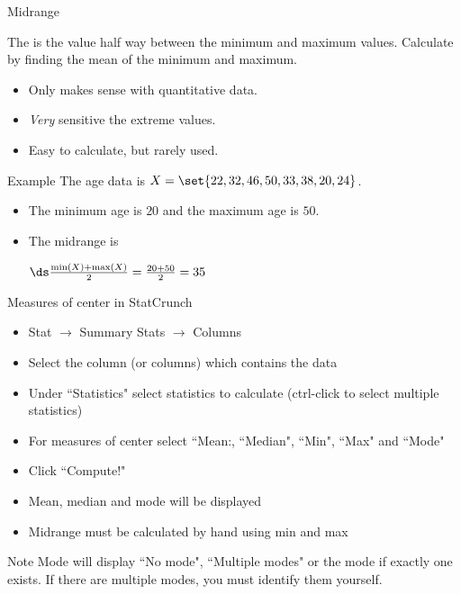 \documentclass[xcolor=table, handout]{beamer}
\begin{document}
\begin{frame}{Midrange}
\begin{block}{}
\large
The  is the value half way between the minimum and maximum values. Calculate by finding the mean of the minimum and maximum.
\begin{itemize}
\item Only makes sense with quantitative data.
\item \emph{Very} sensitive the extreme values.
\item Easy to calculate, but rarely used.
\end{itemize}
\end{block}

\pause
\begin{exampleblock}{Example}
The age data is $X = \set{22, 32, 46, 50, 33, 38, 20, 24}$.
\begin{itemize}
\item The minimum age is $20$ and the maximum age is $50$.
\item The midrange is \\
\smallskip
{\centering
$\ds \frac {\min(X) + \max(X)}{2} = \frac {20 + 50}{2} = 35$
\par}
\end{itemize}
\smallskip
\end{exampleblock}

\end{frame}

\begin{frame}{Measures of center in StatCrunch}
\begin{block}{}
\begin{itemize}
\item Stat $\to$ Summary Stats $\to$ Columns
\item Select the column (or columns) which contains the data
\item Under ``Statistics" select statistics to calculate (ctrl-click to select multiple statistics)
\item For measures of center select ``Mean:, ``Median", ``Min", ``Max" and ``Mode"
\item Click ``Compute!"
\item Mean, median and mode will be displayed
\item Midrange must be calculated by hand using min and max
\end{itemize}
\end{block}

\begin{alertblock}{Note}
Mode will display ``No mode", ``Multiple modes" or the mode if exactly one exists. If there are multiple modes, you must identify them yourself.
\end{alertblock}
\end{frame}
\end{document}
